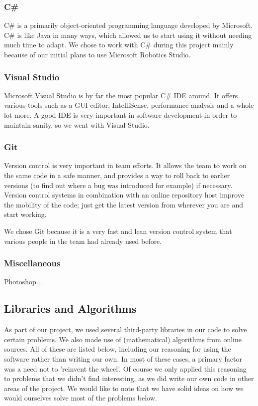 \documentclass[10pt, abstracton, twocolumn]{scrartcl}
\begin{document}
\subsubsection{C\#}
C\# is a primarily object-oriented programming language developed by Microsoft. C\# is like Java in many ways, which allowed us to start using it without needing much time to adapt. We chose to work with C\# during this project mainly because of our initial plans to use Microsoft Robotics Studio.

\subsubsection{Visual Studio}
Microsoft Visual Studio is by far the most popular C\# IDE around. It offers various tools such as a GUI editor, IntelliSense, performance analysis and a whole lot more. A good IDE is very important in software development in order to maintain sanity, so we went with Visual Studio.

\subsubsection{Git}
Version control is very important in team efforts. It allows the team to work on the same code in a safe manner, and provides a way to roll back to earlier versions (to find out where a bug was introduced for example) if necessary. Version control systems in combination with an online repository host improve the mobility of the code; just get the latest version from wherever you are and start working.

We chose Git because it is a very fast and lean version control system that various people in the team had already used before.

\subsubsection{Miscellaneous}
Photoshop...

\subsection{Libraries and Algorithms}
As part of our project, we used several third-party libraries in our code to solve certain problems. We also made use of (mathematical) algorithms from online sources. All of these are listed below, including our reasoning for using the software rather than writing our own. In most of these cases, a primary factor was a need not to 'reinvent the wheel'. Of course we only applied this reasoning to problems that we didn't find interesting, as we did write our own code in other areas of the project. We would like to note that we have solid ideas on how we would ourselves solve most of the problems below.
\end{document}
